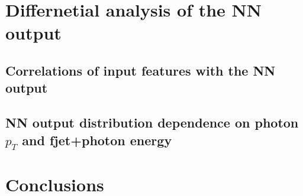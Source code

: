 \chapter{Differnetial analysis of the NN output}
\section{Correlations of input features with the NN output}
\section{NN output distribution dependence on photon \texorpdfstring{$p_T$}{pT} and fjet+photon energy}
\chapter{Conclusions}